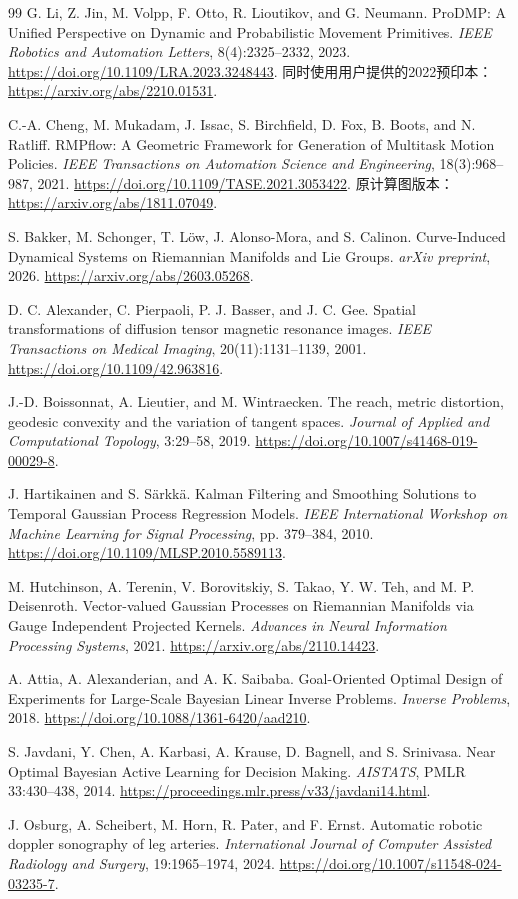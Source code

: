 \documentclass[UTF8,11pt,a4paper,fontset=fandol]{ctexart}
\numberwithin{equation}{section}
\theoremstyle{definition}
\begin{document}
\begin{thebibliography}{99}
G. Li, Z. Jin, M. Volpp, F. Otto, R. Lioutikov, and G. Neumann.
ProDMP: A Unified Perspective on Dynamic and Probabilistic Movement Primitives.
\emph{IEEE Robotics and Automation Letters}, 8(4):2325--2332, 2023.
\url{https://doi.org/10.1109/LRA.2023.3248443}.
同时使用用户提供的2022预印本：\url{https://arxiv.org/abs/2210.01531}.

C.-A. Cheng, M. Mukadam, J. Issac, S. Birchfield, D. Fox, B. Boots, and N. Ratliff.
RMPflow: A Geometric Framework for Generation of Multitask Motion Policies.
\emph{IEEE Transactions on Automation Science and Engineering}, 18(3):968--987, 2021.
\url{https://doi.org/10.1109/TASE.2021.3053422}.
原计算图版本：\url{https://arxiv.org/abs/1811.07049}.

S. Bakker, M. Schonger, T. L\"ow, J. Alonso-Mora, and S. Calinon.
Curve-Induced Dynamical Systems on Riemannian Manifolds and Lie Groups.
\emph{arXiv preprint}, 2026.
\url{https://arxiv.org/abs/2603.05268}.

D. C. Alexander, C. Pierpaoli, P. J. Basser, and J. C. Gee.
Spatial transformations of diffusion tensor magnetic resonance images.
\emph{IEEE Transactions on Medical Imaging}, 20(11):1131--1139, 2001.
\url{https://doi.org/10.1109/42.963816}.

J.-D. Boissonnat, A. Lieutier, and M. Wintraecken.
The reach, metric distortion, geodesic convexity and the variation of tangent spaces.
\emph{Journal of Applied and Computational Topology}, 3:29--58, 2019.
\url{https://doi.org/10.1007/s41468-019-00029-8}.

J. Hartikainen and S. S\"arkk\"a.
Kalman Filtering and Smoothing Solutions to Temporal Gaussian Process Regression Models.
\emph{IEEE International Workshop on Machine Learning for Signal Processing}, pp. 379--384, 2010.
\url{https://doi.org/10.1109/MLSP.2010.5589113}.

M. Hutchinson, A. Terenin, V. Borovitskiy, S. Takao, Y. W. Teh, and M. P. Deisenroth.
Vector-valued Gaussian Processes on Riemannian Manifolds via Gauge Independent Projected Kernels.
\emph{Advances in Neural Information Processing Systems}, 2021.
\url{https://arxiv.org/abs/2110.14423}.

A. Attia, A. Alexanderian, and A. K. Saibaba.
Goal-Oriented Optimal Design of Experiments for Large-Scale Bayesian Linear Inverse Problems.
\emph{Inverse Problems}, 2018.
\url{https://doi.org/10.1088/1361-6420/aad210}.

S. Javdani, Y. Chen, A. Karbasi, A. Krause, D. Bagnell, and S. Srinivasa.
Near Optimal Bayesian Active Learning for Decision Making.
\emph{AISTATS}, PMLR 33:430--438, 2014.
\url{https://proceedings.mlr.press/v33/javdani14.html}.

J. Osburg, A. Scheibert, M. Horn, R. Pater, and F. Ernst.
Automatic robotic doppler sonography of leg arteries.
\emph{International Journal of Computer Assisted Radiology and Surgery}, 19:1965--1974, 2024.
\url{https://doi.org/10.1007/s11548-024-03235-7}.
\end{thebibliography}
\end{document}

